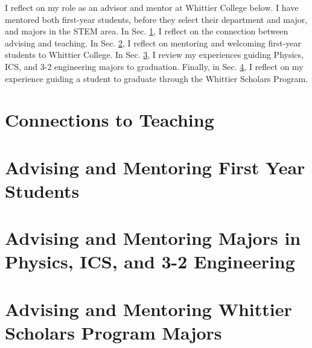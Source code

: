 \documentclass[../../main.tex]{subfiles}
\begin{document}
\label{sec:advising_mentoring}

I reflect on my role as an advisor and mentor at Whittier College below.  I have mentored both first-year students, before they select their department and major, and majors in the STEM area.  In Sec. \ref{sec:adv_teaching}, I reflect on the connection between advising and teaching.  In Sec. \ref{sec:first_year}, I reflect on mentoring and welcoming first-year students to Whittier College.  In Sec. \ref{sec:adv_stem}, I review my experiences guiding Physics, ICS, and 3-2 engineering majors to graduation.  Finally, in Sec. \ref{sec:adv_wsp}, I reflect on my experience guiding a student to graduate through the Whittier Scholars Program.

\section{Connections to Teaching}
\label{sec:adv_teaching}

%

\begin{flushleft}

\end{flushleft}

\section{Advising and Mentoring First Year Students}
\label{sec:first_year}

%

\begin{flushleft}

\end{flushleft}

\section{Advising and Mentoring Majors in Physics, ICS, and 3-2 Engineering}
\label{sec:adv_stem}

%

\begin{flushleft}

\end{flushleft}

\section{Advising and Mentoring Whittier Scholars Program Majors}
\label{sec:adv_wsp}

%

\begin{flushleft}

\end{flushleft}
\end{document}
